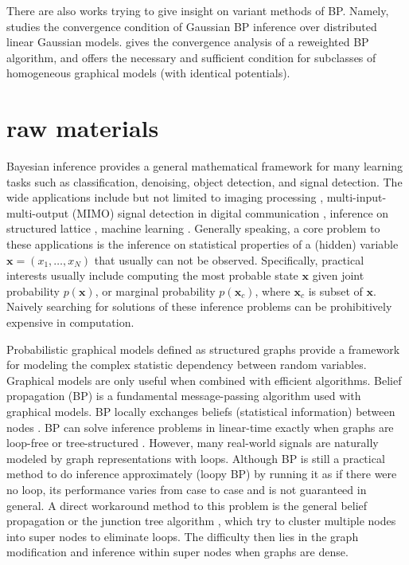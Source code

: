 There are also works trying to give insight on variant methods of BP. Namely,
\cite{du2017convergenceBP,malioutov2006walk-sums} studies the convergence condition of Gaussian BP inference over distributed linear Gaussian models. \cite{roosta2008reweighed_sum_product} gives the convergence analysis of a reweighted BP algorithm, and offers the necessary and sufficient condition for subclasses of homogeneous graphical models (with identical potentials).


\section{raw materials}
Bayesian inference provides a general mathematical framework for many learning tasks such as classification, denoising, object detection, and signal detection. The wide applications include but not limited to imaging processing \cite{zhang2013denoise}, multi-input-multi-output (MIMO) signal detection in digital communication \cite{cespedes2014ep,jeon2015optimality}, inference on structured lattice \cite{10.2307/25651244}, machine learning  \cite{2018arXiv180607066M, Lin:2015:DLM:2969239.2969280, yoon2019inferenceGraph}.
Generally speaking, a core problem to these applications is the inference on statistical properties of a (hidden) variable $\bm{x} = (x_1,\dots,x_N)$ that usually can not be observed.
Specifically, practical interests usually include computing the most probable state $\bm{x}$ given joint probability $p(\bm{x})$, or marginal probability $p(\bm{x}_c)$, where $\bm{x}_c$ is subset of $\bm{x}$. Naively searching for solutions of these inference problems can be prohibitively expensive in computation.


Probabilistic graphical models defined as structured graphs provide a framework for modeling the complex statistic dependency between random variables. Graphical models are only useful when combined with efficient algorithms. Belief propagation (BP) is a fundamental message-passing algorithm used with graphical models. BP locally exchanges beliefs (statistical information) between nodes \cite{kschischang2001factor_graph, Bishop:2006:PRM:1162264}. BP can solve inference problems in linear-time exactly when graphs are loop-free or tree-structured \cite{kschischang2001factor_graph}. However, many real-world signals are naturally modeled by graph representations with loops. Although BP is still a practical method to do inference approximately (loopy BP) by running it as if there were no loop, its performance varies from case to case and is not guaranteed in general. A direct workaround method to this problem is the general belief propagation \cite{Yedidia:2000:GBP:3008751.3008848} or the junction tree algorithm \cite{wainwright2008graphical}, which try to cluster multiple nodes into super nodes to eliminate loops. The difficulty then lies in the graph modification and inference within super nodes when graphs are dense.

